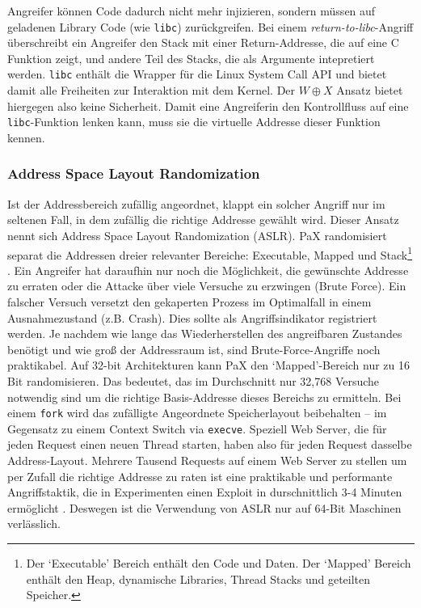 Angreifer können Code dadurch nicht mehr injizieren, sondern müssen auf geladenen Library Code (wie \texttt{libc}) zurückgreifen. Bei einem \textit{return-to-libc}-Angriff überschreibt ein Angreifer den Stack mit einer Return-Addresse, die auf eine C Funktion zeigt, und andere Teil des Stacks, die als Argumente intepretiert werden. \texttt{libc} enthält die Wrapper für die Linux System Call API und bietet damit alle Freiheiten zur Interaktion mit dem Kernel. Der $W \oplus X$ Ansatz bietet hiergegen also keine Sicherheit. Damit eine Angreiferin den Kontrollfluss auf eine \texttt{libc}-Funktion lenken kann, muss sie die virtuelle Addresse dieser Funktion kennen.

\subsubsection{Address Space Layout Randomization}
\label{sec:aslr}

Ist der Addressbereich zufällig angeordnet, klappt ein solcher Angriff nur im seltenen Fall, in dem zufällig die richtige Addresse gewählt wird. Dieser Ansatz nennt sich Address Space Layout Randomization (ASLR). PaX randomisiert separat die Addressen dreier relevanter Bereiche: Executable, Mapped und Stack\footnote{Der `Executable' Bereich  enthält den
Code und Daten. Der `Mapped' Bereich enthält den Heap, dynamische Libraries, Thread Stacks und geteilten Speicher.} \cite{pax-aslr}.
Ein Angreifer hat daraufhin nur noch die Möglichkeit, die gewünschte Addresse zu erraten oder die Attacke über viele Versuche zu erzwingen (Brute Force). Ein falscher Versuch versetzt den gekaperten Prozess im Optimalfall in einem Ausnahmezustand (z.B. Crash). Dies sollte als Angriffsindikator registriert werden. Je nachdem wie lange das Wiederherstellen des
angreifbaren Zustandes benötigt und wie groß der Addressraum ist, sind Brute-Force-Angriffe noch praktikabel. Auf 32-bit Architekturen kann PaX den `Mapped'-Bereich nur zu 16 Bit randomisieren. Das bedeutet, das im Durchschnitt nur 32,768 Versuche notwendig sind um die richtige Basis-Addresse dieses Bereichs zu ermitteln. Bei einem \texttt{fork} wird das zufälligte Angeordnete Speicherlayout beibehalten -- im Gegensatz zu einem Context Switch via \texttt{execve}. Speziell Web Server,
die für jeden Request einen neuen Thread starten, haben also für jeden Request dasselbe Address-Layout. Mehrere Tausend Requests auf einem Web Server zu stellen um per Zufall die richtige Addresse zu raten ist eine praktikable und performante Angriffstaktik, die in Experimenten einen Exploit in durschnittlich 3-4 Minuten ermöglicht \cite{shacham_2004}.
Deswegen ist die Verwendung von ASLR nur auf 64-Bit Maschinen verlässlich.

